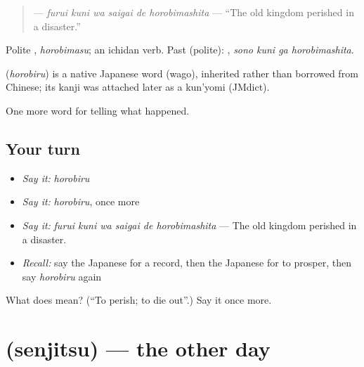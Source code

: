 \begin{quote}
\textbf{   } — \emph{furui kuni wa saigai de horobimashita} — \textquotedblleft{}The old kingdom perished in a disaster.\textquotedblright{}
\end{quote}

Polite \textbf{}, \emph{horobimasu}; an ichidan verb. Past (polite): \textbf{  }, \emph{sono kuni ga horobimashita}.

\begin{cousinweb}
\textbf{} (\emph{horobiru}) is a native Japanese word (wago), inherited rather than borrowed from Chinese; its kanji was attached later as a kun'yomi (JMdict).
\end{cousinweb}

\begin{grammarlens}[title={What you've built}]
One more word for telling what happened.
\end{grammarlens}

\subsection*{Your turn}
\begin{itemize}
\raggedright
  \item \emph{Say it:} \emph{horobiru}
  \item \emph{Say it:} \emph{horobiru}, once more
  \item \emph{Say it:} \emph{furui kuni wa saigai de horobimashita} — The old kingdom perished in a disaster.
  \item \emph{Recall:} say the Japanese for a record, then the Japanese for to prosper, then say \emph{horobiru} again
\end{itemize}

\begin{tcolorbox}[breakable,colback=teal!4,colframe=teal!35!black,title={Before you move on}]
What does  mean? (\textquotedblleft{}To perish; to die out\textquotedblright{}.) Say it once more.
\end{tcolorbox}
\section[\texorpdfstring{\ja{せんじつ} (senjitsu)}{せんじつ (senjitsu)}]{ (senjitsu) — the other day}

\label{lesson:JA-C313-senjitsu}



